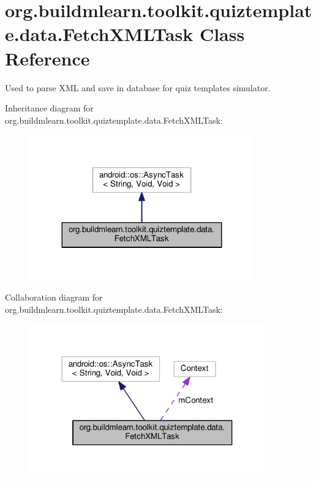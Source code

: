 \hypertarget{classorg_1_1buildmlearn_1_1toolkit_1_1quiztemplate_1_1data_1_1FetchXMLTask}{}\section{org.\+buildmlearn.\+toolkit.\+quiztemplate.\+data.\+Fetch\+X\+M\+L\+Task Class Reference}
\label{classorg_1_1buildmlearn_1_1toolkit_1_1quiztemplate_1_1data_1_1FetchXMLTask}


Used to parse X\+ML and save in database for quiz template\textquotesingle{}s simulator.  




Inheritance diagram for org.\+buildmlearn.\+toolkit.\+quiztemplate.\+data.\+Fetch\+X\+M\+L\+Task\+:
\nopagebreak
\begin{figure}[H]
\begin{center}
\leavevmode
\includegraphics[width=275pt]{classorg_1_1buildmlearn_1_1toolkit_1_1quiztemplate_1_1data_1_1FetchXMLTask__inherit__graph}
\end{center}
\end{figure}


Collaboration diagram for org.\+buildmlearn.\+toolkit.\+quiztemplate.\+data.\+Fetch\+X\+M\+L\+Task\+:
\nopagebreak
\begin{figure}[H]
\begin{center}
\leavevmode
\includegraphics[width=289pt]{classorg_1_1buildmlearn_1_1toolkit_1_1quiztemplate_1_1data_1_1FetchXMLTask__coll__graph}
\end{center}
\end{figure}
